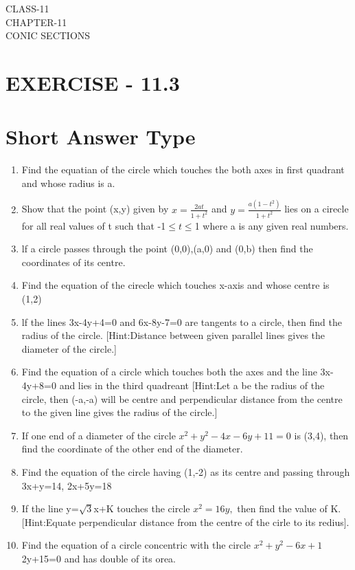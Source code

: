 \documentclass[12pt]{article}
\begin{document}
\begin{center}
\textbf\large{CLASS-11\\CHAPTER-11 \\ CONIC SECTIONS}
\end{center}

\section*{EXERCISE - 11.3}
\section*{Short Answer Type}
\begin{enumerate}
 \item Find the equatian of the circle which touches the both axes in first quadrant and whose radius is a.
 \item Show that the point (x,y) given by $x=\frac{2at}{1+t^2}$ and $y=\frac{a(1-t^2)}{1+t^2}$ lies on a cirecle for all real values of t such that -1$\le t \le $1 where a is any given real numbers. 
 \item lf a circle passes through the point (0,0),(a,0) and (0,b) then find the coordinates of its centre.
 \item Find the equation of the cirecle which touches x-axis and whose centre is (1,2)
 \item lf the lines 3x-4y+4=0 and 6x-8y-7=0 are tangents to a circle, then find the radius of the circle.
 [Hint:Distance between given parallel lines gives the diameter of the circle.]
 \item Find the equation of a circle which touches  both the axes and the line 3x-4y+8=0 and lies in the third quadreant
 [Hint:Let a be the radius of the circle, then (-a,-a) will be centre and perpendicular distance from the centre to the given line gives the radius of the circle.]
 \item If one end of a diameter of the circle $x^2+y^2-4x-6y+11 =0$ is (3,4), then find the coordinate of the other end of the diameter.
 \item Find the equation of the circle having (1,-2) as its centre  and passing through 3x+y=14, 2x+5y=18
 \item If the line y=$\sqrt{3}$x+K touches the circle $x^2=16y,$ then find the value of K.
 [Hint:Equate perpendicular distance from the centre of the cirle to its redius].
 \item Find the equation of a circle concentric with the circle $x^2+y^2-6x+1$2y+15=0 and has double of its orea.

\end{enumerate}
\end{document}
